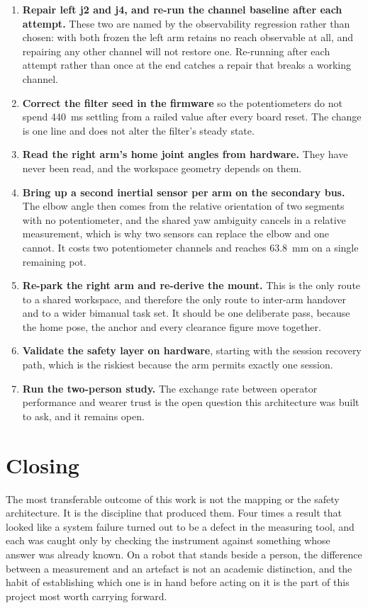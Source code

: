 \begin{enumerate}
  \item \textbf{Repair left j2 and j4, and re-run the channel baseline after
    each attempt.} These two are named by the observability regression rather
    than chosen: with both frozen the left arm retains no reach observable at
    all, and repairing any other channel will not restore one. Re-running
    after each attempt rather than once at the end catches a repair that
    breaks a working channel.
  \item \textbf{Correct the filter seed in the firmware} so the potentiometers
    do not spend \SI{440}{\milli\second} settling from a railed value after
    every board reset. The change is one line and does not alter the filter's
    steady state.
  \item \textbf{Read the right arm's home joint angles from hardware.} They
    have never been read, and the workspace geometry depends on them.
  \item \textbf{Bring up a second inertial sensor per arm on the secondary
    bus.} The elbow angle then comes from the relative orientation of two
    segments with no potentiometer, and the shared yaw ambiguity cancels in a
    relative measurement, which is why two sensors can replace the elbow and
    one cannot. It costs two potentiometer channels and reaches
    \SI{63.8}{\milli\metre} on a single remaining pot.
  \item \textbf{Re-park the right arm and re-derive the mount.} This is the
    only route to a shared workspace, and therefore the only route to
    inter-arm handover and to a wider bimanual task set. It should be one
    deliberate pass, because the home pose, the anchor and every clearance
    figure move together.
  \item \textbf{Validate the safety layer on hardware}, starting with the
    session recovery path, which is the riskiest because the arm permits
    exactly one session.
  \item \textbf{Run the two-person study.} The exchange rate between operator
    performance and wearer trust is the open question this architecture was
    built to ask, and it remains open.
\end{enumerate}

\section{Closing}

The most transferable outcome of this work is not the mapping or the safety
architecture. It is the discipline that produced them. Four times a result
that looked like a system failure turned out to be a defect in the measuring
tool, and each was caught only by checking the instrument against something
whose answer was already known. On a robot that stands beside a person, the
difference between a measurement and an artefact is not an academic
distinction, and the habit of establishing which one is in hand before acting
on it is the part of this project most worth carrying forward.
